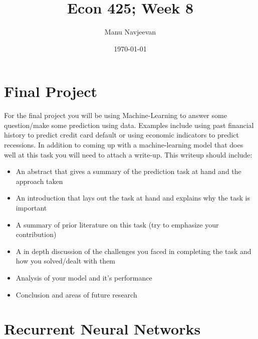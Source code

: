 \documentclass[10pt]{article}
\title{Econ 425; Week 8}%
\author{Manu Navjeevan}
\date{\today}
\begin{document}
\maketitle

\section{Final Project}%
\label{sec:final-proj}

For the final project you will be using Machine-Learning to answer some question/make some prediction using data. Examples include using past financial history to predict credit card default or using economic indicators to predict recessions. In addition to coming up with a machine-learning model that does well at this task you will need to attach a write-up. This writeup should include: 
\begin{itemize}
	\item An abstract that gives a summary of the prediction task at hand and the approach taken
	\item An introduction that lays out the task at hand and explains why the task is important
	\item A summary of prior literature on this task (try to emphasize your contribution)
	\item A in depth discussion of the challenges you faced in completing the task and how you solved/dealt with them
	\item Analysis of your model and it's performance
	\item Conclusion and areas of future research
\end{itemize}

\section{Recurrent Neural Networks}%
\label{sec:reccurent-NN}
\end{document}
